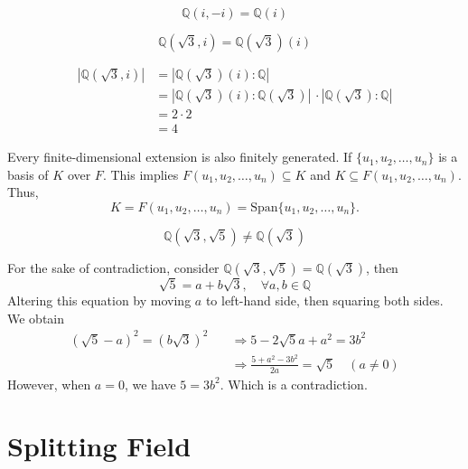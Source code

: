 \begin{example}
    \[
        \mathbb{Q}(i, -i) = \mathbb{Q}(i)
    \]
\end{example}

\begin{example}
    $$\mathbb{Q}(\sqrt{3}, i) = \mathbb{Q}(\sqrt{3})(i)$$
\end{example}
\begin{solution}
    \begin{align*}
        |\mathbb{Q}(\sqrt{3}, i)| &= |\mathbb{Q}(\sqrt{3})(i): \mathbb{Q}|\\
        &= |\mathbb{Q}(\sqrt{3})(i): \mathbb{Q}(\sqrt{3})| \, \cdot |\mathbb{Q}(\sqrt{3}): \mathbb{Q}|\\
        &= 2 \cdot 2\\
        &= 4
    \end{align*}
\end{solution}

\begin{example}
    Every finite-dimensional extension is also finitely generated. If $\{ u_1, u_2, \ldots, u_n \}$ 
    is a basis of $K$ over $F$. This implies $F(u_1, u_2, \ldots, u_n) \subseteq K$ and 
    $K \subseteq F(u_1, u_2, \ldots, u_n)$. 
    Thus,
    \[
        K = F(u_1, u_2, \ldots, u_n) = \text{Span}\{ u_1, u_2, \ldots, u_n \}.
    \]
\end{example}

\begin{example}
     $$\mathbb{Q}(\sqrt{3}, \sqrt{5}) \neq \mathbb{Q}(\sqrt{3})$$
\end{example}
\begin{solution}
    For the sake of contradiction, consider $\mathbb{Q}(\sqrt{3}, \sqrt{5}) = \mathbb{Q}(\sqrt{3})$, then 
    \[
        \sqrt{5} = a+ b\sqrt{3}, \quad \forall a,b \in \mathbb{Q}
    \]
    Altering this equation by moving $a$ to left-hand side, then squaring both sides. We obtain
    \begin{align*}
        (\sqrt{5} - a)^2 = (b\sqrt{3})^2 \quad &\Rightarrow 5 - 2\sqrt{5}a + a^2 = 3b^2\\
        &\Rightarrow \frac{5 + a^2 - 3b^2}{2a} = \sqrt{5} \quad (a\neq 0)
    \end{align*}
    However, when $a=0$, we have $5 = 3b^2$. Which is a contradiction.
\end{solution}

\section{Splitting Field}

